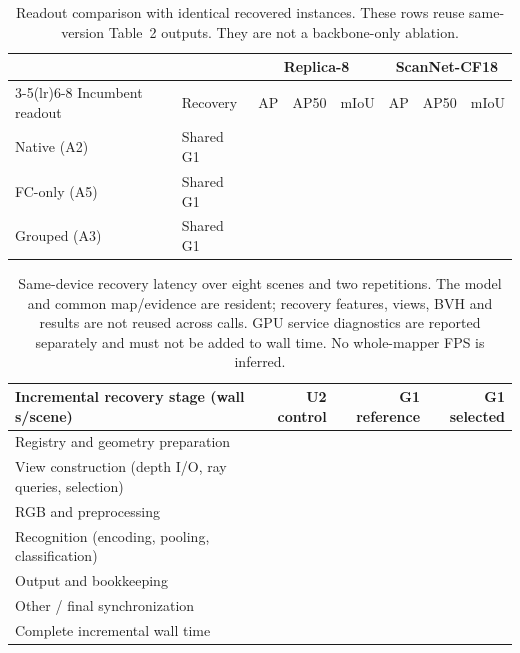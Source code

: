 \providecommand{\NA}{\textemdash}

\begin{table}[t]
\centering\small
\setlength{\tabcolsep}{5pt}
\begin{tabular}{llrrrrrr}
\toprule
& & \multicolumn{3}{c}{Replica-8} & \multicolumn{3}{c}{ScanNet-CF18}\\
\cmidrule(lr){3-5}\cmidrule(lr){6-8}
Incumbent readout & Recovery & AP & AP50 & mIoU & AP & AP50 & mIoU\\
\midrule
Native (A2) & Shared G1 & \NA&\NA&\NA&\NA&\NA&\NA\\
FC-only (A5) & Shared G1 & \NA&\NA&\NA&\NA&\NA&\NA\\
Grouped (A3) & Shared G1 & \NA&\NA&\NA&\NA&\NA&\NA\\
\bottomrule
\end{tabular}
\caption{Readout comparison with identical recovered instances. These rows reuse
same-version Table~2 outputs. They are not a backbone-only ablation.}
\label{tab:si_readout}
\end{table}

\begin{table}[t]
\centering\small
\setlength{\tabcolsep}{6pt}
\begin{tabular}{lrrr}
\toprule
Incremental recovery stage (wall s/scene) & U2 control & G1 reference & G1 selected\\
\midrule
Registry and geometry preparation & \NA&\NA&\NA\\
View construction (depth I/O, ray queries, selection) & \NA&\NA&\NA\\
RGB and preprocessing & \NA&\NA&\NA\\
Recognition (encoding, pooling, classification) & \NA&\NA&\NA\\
Output and bookkeeping & \NA&\NA&\NA\\
Other / final synchronization & \NA&\NA&\NA\\
\midrule
Complete incremental wall time & \NA&\NA&\NA\\
\bottomrule
\end{tabular}
\caption{Same-device recovery latency over eight scenes and two repetitions.
The model and common map/evidence are resident; recovery features, views, BVH and
results are not reused across calls. GPU service diagnostics are reported separately
and must not be added to wall time. No whole-mapper FPS is inferred.}
\label{tab:si_runtime}
\end{table}
